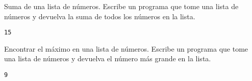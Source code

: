 \begin{exercise}
Suma de una lista de números. Escribe un programa que tome una lista
de números y devuelva la suma de todos los números en la lista.

\begin{Shaded}
\begin{Highlighting}[]
 

     \NormalTok{(}\OperatorTok{+}

\OperatorTok{=}\NormalTok{ [}\NormalTok{, }\NormalTok{, }\NormalTok{, }\NormalTok{, }\NormalTok{]}
\OperatorTok{=}
\end{Highlighting}
\end{Shaded}

\begin{verbatim}
15

\end{verbatim}
\end{exercise}

\begin{exercise}
Encontrar el máximo en una lista de números. Escribe un programa que
tome una lista de números y devuelva el número más grande en la lista.

\begin{Shaded}
\begin{Highlighting}[]
 

     \NormalTok{(}\OperatorTok{\textgreater{}}

\OperatorTok{=}\NormalTok{ [}\NormalTok{, }\NormalTok{, }\NormalTok{, }\NormalTok{, }\NormalTok{]}
\OperatorTok{=}
\end{Highlighting}
\end{Shaded}

\begin{verbatim}
9

\end{verbatim}
\end{exercise}


